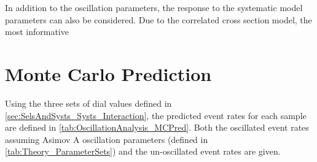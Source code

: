 In addition to the oscillation parameters, the response to the systematic model parameters can also be considered. Due to the correlated cross section model, the most informative 

\section{Monte Carlo Prediction}
\label{sec:OscillationAnalysis_MonteCarloPred}

Using the three sets of dial values defined in \autoref{sec:SelsAndSysts_Systs_Interaction}, the predicted event rates for each sample are defined in \autoref{tab:OscillationAnalysis_MCPred}. Both the oscillated event rates assuming Asimov A oscillation parameters (defined in \autoref{tab:Theory_ParameterSets}) and the un-oscillated event rates are given.

